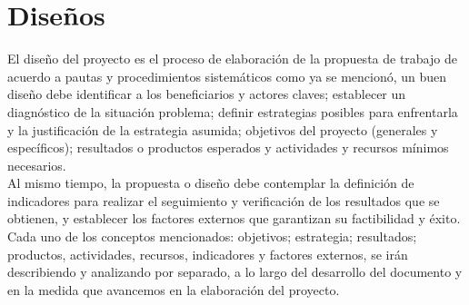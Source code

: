 \documentclass[a4paper,DIV=12]{scrreprt}
\begin{document}






\newpage
\setcounter{chapter}{8}
\setcounter{section}{-1}
\setcounter{subsection}{-1}
\section{Diseños}
\noindent
El diseño del proyecto es el proceso de elaboración de la propuesta de trabajo de acuerdo
a pautas y procedimientos sistemáticos como ya se mencionó, un buen diseño debe identificar a
los beneficiarios y actores claves; establecer un diagnóstico de la situación problema; definir
estrategias posibles para enfrentarla y la justificación de la estrategia asumida; objetivos del
proyecto (generales y específicos); resultados o productos esperados y actividades y recursos
mínimos necesarios.\\
Al mismo tiempo, la propuesta o diseño debe contemplar la definición de indicadores para
realizar el seguimiento y verificación de los resultados que se obtienen, y establecer los factores
externos que garantizan su factibilidad y éxito.\\
Cada uno de los conceptos mencionados: objetivos; estrategia; resultados; productos,
actividades, recursos, indicadores y factores externos, se irán describiendo y analizando por separado, a lo largo del desarrollo del documento y en la medida que avancemos en la elaboración del proyecto.\\
\setcounter{section}{1}
\setcounter{subsection}{-1}
\end{document}
